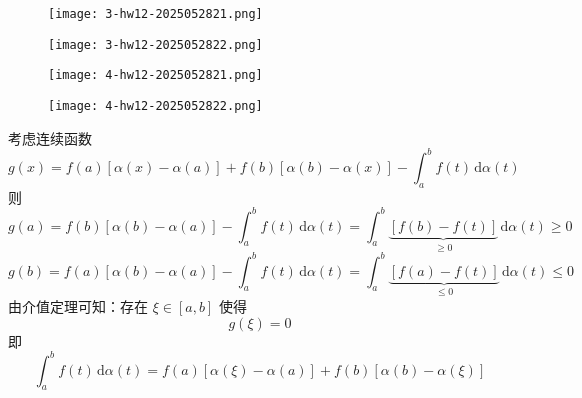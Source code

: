\begin{exercise}
\begin{figure}[H]
\centering
\texttt{[image: 3-hw12-2025052821.png]}
\label{}
\end{figure}
\end{exercise}
\begin{figure}[H]
\centering
\texttt{[image: 3-hw12-2025052822.png]}
\label{}
\end{figure}

\begin{exercise}
\begin{figure}[H]
\centering
\texttt{[image: 4-hw12-2025052821.png]}
\label{}
\end{figure}
\end{exercise}
\begin{figure}[H]
\centering
\texttt{[image: 4-hw12-2025052822.png]}
\label{}
\end{figure}

考虑连续函数
\[
g(x)=f(a)[\alpha(x)-\alpha(a)]+f(b)[\alpha(b)-\alpha(x)]-\int_{a}^{b} f(t) \, \mathrm{d}\alpha(t)
\]
则
\[
g(a)=f(b)[\alpha(b)-\alpha(a)]-\int_{a}^{b} f(t) \, \mathrm{d}\alpha(t)=\int_{a}^{b} \underbrace{ [f(b)-f(t)] }_{ \geq 0 } \, \mathrm{d}\alpha(t) \geq 0 
\]
\[
g(b)=f(a)[\alpha(b)-\alpha(a)]-\int_{a}^{b} f(t) \, \mathrm{d}\alpha(t) =\int_{a}^{b} \underbrace{ [f(a)-f(t)]  }_{ \leq 0 }\, \mathrm{d}\alpha(t)\leq 0 
\]
由介值定理可知：存在 $\xi\in[a,b]$ 使得
\[
g(\xi)=0
\]
即
\[
\int_{a}^{b} f(t) \, \mathrm{d}\alpha(t)=f(a)[\alpha(\xi)-\alpha(a)]+f(b)[\alpha(b)-\alpha(\xi)]
\]
